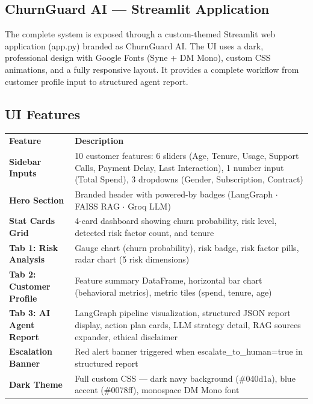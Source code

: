 \documentclass[12pt, a4paper]{article}
\begin{document}
\subsection{ChurnGuard AI --- Streamlit Application}

The complete system is exposed through a custom-themed Streamlit web application (app.py) branded as ChurnGuard AI. The UI uses a dark, professional design with Google Fonts (Syne + DM Mono), custom CSS animations, and a fully responsive layout. It provides a complete workflow from customer profile input to structured agent report.

\subsection{UI Features}

\begin{table}[H]
\centering
\renewcommand{\arraystretch}{1.4}
\begin{tabular}{@{} >{\columncolor{lightrow}\bfseries}p{3.5cm} p{10cm} @{}}
\rowcolor{darkheader}
\textbf{\color{white}Feature} & \textbf{\color{white}Description} \\
Sidebar Inputs & 10 customer features: 6 sliders (Age, Tenure, Usage, Support Calls, Payment Delay, Last Interaction), 1 number input (Total Spend), 3 dropdowns (Gender, Subscription, Contract) \\
\rowcolor{white}
Hero Section & Branded header with powered-by badges (LangGraph $\cdot$ FAISS RAG $\cdot$ Groq LLM) \\
Stat Cards Grid & 4-card dashboard showing churn probability, risk level, detected risk factor count, and tenure \\
\rowcolor{white}
Tab 1: Risk Analysis & Gauge chart (churn probability), risk badge, risk factor pills, radar chart (5 risk dimensions) \\
Tab 2: Customer Profile & Feature summary DataFrame, horizontal bar chart (behavioral metrics), metric tiles (spend, tenure, age) \\
\rowcolor{white}
Tab 3: AI Agent Report & LangGraph pipeline visualization, structured JSON report display, action plan cards, LLM strategy detail, RAG sources expander, ethical disclaimer \\
Escalation Banner & Red alert banner triggered when escalate\_to\_human=true in structured report \\
\rowcolor{white}
Dark Theme & Full custom CSS --- dark navy background (\#040d1a), blue accent (\#0078ff), monospace DM Mono font \\
\end{tabular}
\end{table}
\end{document}
